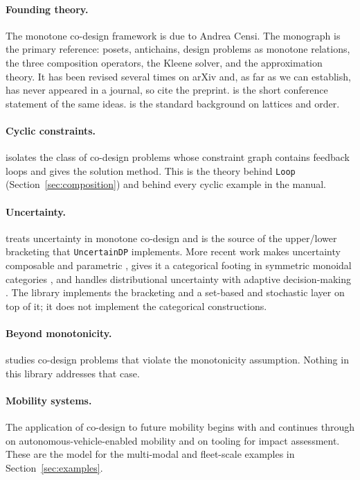 \documentclass[11pt,a4paper]{article}
\begin{document}
\paragraph{Founding theory.} The monotone co-design framework is due to
Andrea Censi. The monograph \citep{censi2015mathematical} is the primary
reference: posets, antichains, design problems as monotone relations, the
three composition operators, the Kleene solver, and the approximation
theory. It has been revised several times on arXiv and, as far as we can
establish, has never appeared in a journal, so cite the preprint.
\citet{censi2016everything} is the short conference statement of the same
ideas. \citet{davey2002lattices} is the standard background on lattices
and order.

\paragraph{Cyclic constraints.} \citet{censi2017cyclic} isolates the class
of co-design problems whose constraint graph contains feedback loops and
gives the solution method. This is the theory behind
\texttt{Loop} (Section~\ref{sec:composition}) and behind every cyclic
example in the manual.

\paragraph{Uncertainty.} \citet{censi2017uncertainty} treats uncertainty
in monotone co-design and is the source of the upper/lower bracketing that
\texttt{UncertainDP} implements. More recent work makes uncertainty
composable and parametric \citep{huang2025composable}, gives it a
categorical footing in symmetric monoidal categories
\citep{furter2026symmetric}, and handles distributional uncertainty with
adaptive decision-making \citep{huang2026distributional}. The library
implements the bracketing and a set-based and stochastic layer on top of
it; it does not implement the categorical constructions.

\paragraph{Beyond monotonicity.} \citet{carlone2019beyond} studies
co-design problems that violate the monotonicity assumption. Nothing in
this library addresses that case.

\paragraph{Mobility systems.} The application of co-design to future
mobility begins with \citet{zardini2020towards} and continues through
\citet{zardini2020avmobility} on autonomous-vehicle-enabled mobility and
\citet{zardini2023tools} on tooling for impact assessment. These are the
model for the multi-modal and fleet-scale examples in
Section~\ref{sec:examples}.
\end{document}
